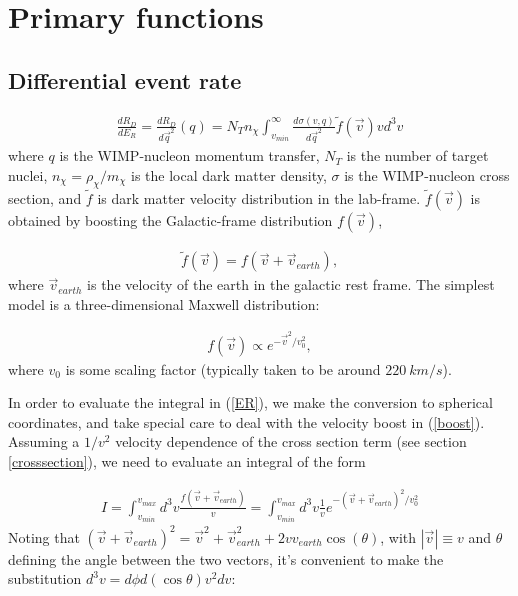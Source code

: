 \documentclass[11pt]{amsart}
\begin{document}
\clearpage

\section{Primary functions}
\subsection{Differential event rate}
\begin{equation}\label{ER}
\begin{split}
	\frac{dR_D}{dE_R} = \frac{dR_D}{d\vec{q}^2}(q)
	 = N_T n_\chi \int_{v_{min}}^\infty \frac{d\sigma(v,q)}{d\vec{q}^2} \tilde{f}(\vec{v})vd^3v
\end{split}
\end{equation}
where $q$ is the WIMP-nucleon momentum transfer, $N_T$ is the number of target nuclei, $n_\chi = \rho_\chi/m_\chi$ is the local dark matter density, $\sigma$ is the WIMP-nucleon cross section, and $\tilde{f}$ is dark matter velocity distribution in the lab-frame. $\tilde{f}(\vec{v})$ is obtained by boosting the Galactic-frame distribution $f(\vec{v})$, 

\begin{equation}\label{boost}
\begin{split}
	\tilde{f}(\vec{v}) = f(\vec{v} + \vec{v}_{earth}),
\end{split}
\end{equation}
where $\vec{v}_{earth}$ is the velocity of the earth in the galactic rest frame. The simplest model is a three-dimensional Maxwell distribution:

\begin{equation}
\begin{split}
	f(\vec{v}) \propto e^{-\vec{v}^2/v_0^2},
\end{split}
\end{equation}
where $v_0$ is some scaling factor (typically taken to be around $220\ km/s$).

In order to evaluate the integral in (\ref{ER}), we make the conversion to spherical coordinates, and take special care to deal with the velocity boost in (\ref{boost}). Assuming a $1/v^2$ velocity dependence of the cross section term (see section \ref{crosssection}), we need to evaluate an integral of the form

\begin{equation}
\begin{split}
	I = \int_{v_{min}}^{v_{max}} d^3v \frac{f(\vec{v} + \vec{v}_{earth})}{v} =
    	\int_{v_{min}}^{v_{max}} d^3v \frac{1}{v} e^{-(\vec{v}+\vec{v}_{earth})^2/v_0^2}
\end{split}
\end{equation}
Noting that $(\vec{v}+\vec{v}_{earth})^2 = \vec{v}^2 + \vec{v}^2_{earth} + 2vv_{earth}\cos(\theta)$, with $|\vec{v}|\equiv v$ and $\theta$ defining the angle between the two vectors, it's convenient to make the substitution $d^3v = d\phi d(\cos \theta) v^2 dv$:
\end{document}
